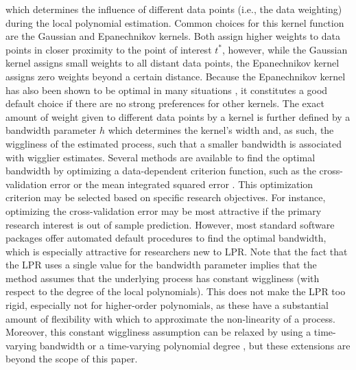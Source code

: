 \documentclass[man, floatsintext]{apa7}
\begin{document}
\noindent which determines the influence of different data points (i.e., the
data weighting) during the local polynomial estimation. Common choices for this
kernel function are the Gaussian and Epanechnikov kernels. Both assign higher
weights to data points in closer proximity to the point of interest $t^*$,
however, while the Gaussian kernel assigns small weights to all distant data
points, the Epanechnikov kernel assigns zero weights beyond a certain distance.
Because the Epanechnikov kernel has also been shown to be optimal in many
situations \parencite{fan_local_1997}, it constitutes a good default choice if
there are no strong preferences for other kernels. The exact amount of weight
given to different data points by a kernel is further defined by a bandwidth
parameter $h$ which determines the kernel's width and, as such, the wiggliness
of the estimated process, such that a smaller bandwidth is associated with
wigglier estimates. Several methods are available to find the optimal bandwidth
by optimizing a data-dependent criterion function, such as the cross-validation
error or the mean integrated squared error \parencite{kohler_review_2014,
  debruyne_model_2008}. This optimization criterion may be selected based on
specific research objectives. For instance, optimizing the cross-validation
error may be most attractive if the primary research interest is out of sample
prediction. However, most standard software packages offer automated default
procedures to find the optimal bandwidth, which is especially attractive for
researchers new to LPR\@. Note that the fact that the LPR uses a single value
for the bandwidth parameter implies that the method assumes that the underlying
process has constant wiggliness (with respect to the degree of the local
polynomials). This does not make the LPR too rigid, especially not for
higher-order polynomials, as these have a substantial amount of flexibility
with which to approximate the non-linearity of a process. Moreover, this
constant wiggliness assumption can be relaxed by using a time-varying bandwidth
\parencite{fan_data-driven_1995} or a time-varying polynomial degree
\parencite{fan_adaptive_1995}, but these extensions are beyond the scope of
this paper.
\end{document}
